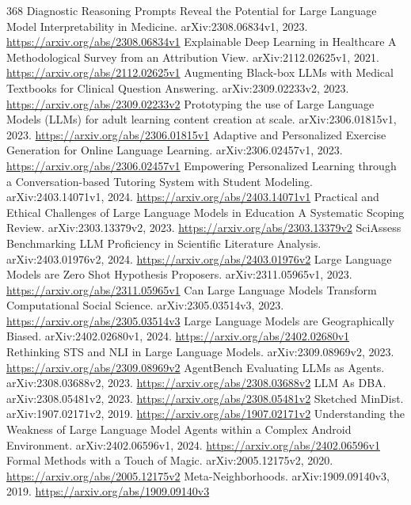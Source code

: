 \documentclass[11pt]{article}
\begin{document}
\begin{thebibliography}{368}
 Diagnostic Reasoning Prompts Reveal the Potential for Large Language Model Interpretability in Medicine. arXiv:2308.06834v1, 2023. \url{https://arxiv.org/abs/2308.06834v1}
 Explainable Deep Learning in Healthcare A Methodological Survey from an Attribution View. arXiv:2112.02625v1, 2021. \url{https://arxiv.org/abs/2112.02625v1}
 Augmenting Black-box LLMs with Medical Textbooks for Clinical Question Answering. arXiv:2309.02233v2, 2023. \url{https://arxiv.org/abs/2309.02233v2}
 Prototyping the use of Large Language Models (LLMs) for adult learning content creation at scale. arXiv:2306.01815v1, 2023. \url{https://arxiv.org/abs/2306.01815v1}
 Adaptive and Personalized Exercise Generation for Online Language Learning. arXiv:2306.02457v1, 2023. \url{https://arxiv.org/abs/2306.02457v1}
 Empowering Personalized Learning through a Conversation-based Tutoring System with Student Modeling. arXiv:2403.14071v1, 2024. \url{https://arxiv.org/abs/2403.14071v1}
 Practical and Ethical Challenges of Large Language Models in Education A Systematic Scoping Review. arXiv:2303.13379v2, 2023. \url{https://arxiv.org/abs/2303.13379v2}
 SciAssess Benchmarking LLM Proficiency in Scientific Literature Analysis. arXiv:2403.01976v2, 2024. \url{https://arxiv.org/abs/2403.01976v2}
 Large Language Models are Zero Shot Hypothesis Proposers. arXiv:2311.05965v1, 2023. \url{https://arxiv.org/abs/2311.05965v1}
 Can Large Language Models Transform Computational Social Science. arXiv:2305.03514v3, 2023. \url{https://arxiv.org/abs/2305.03514v3}
 Large Language Models are Geographically Biased. arXiv:2402.02680v1, 2024. \url{https://arxiv.org/abs/2402.02680v1}
 Rethinking STS and NLI in Large Language Models. arXiv:2309.08969v2, 2023. \url{https://arxiv.org/abs/2309.08969v2}
 AgentBench Evaluating LLMs as Agents. arXiv:2308.03688v2, 2023. \url{https://arxiv.org/abs/2308.03688v2}
 LLM As DBA. arXiv:2308.05481v2, 2023. \url{https://arxiv.org/abs/2308.05481v2}
 Sketched MinDist. arXiv:1907.02171v2, 2019. \url{https://arxiv.org/abs/1907.02171v2}
 Understanding the Weakness of Large Language Model Agents within a Complex Android Environment. arXiv:2402.06596v1, 2024. \url{https://arxiv.org/abs/2402.06596v1}
 Formal Methods with a Touch of Magic. arXiv:2005.12175v2, 2020. \url{https://arxiv.org/abs/2005.12175v2}
 Meta-Neighborhoods. arXiv:1909.09140v3, 2019. \url{https://arxiv.org/abs/1909.09140v3}

\end{thebibliography}
\end{document}
